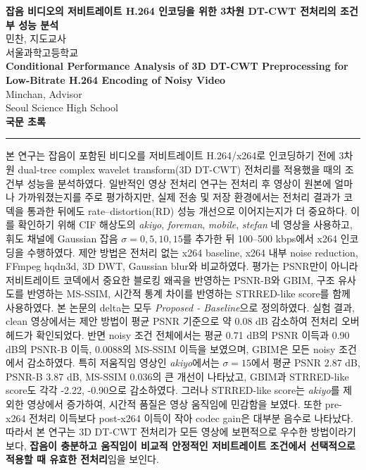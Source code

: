 \documentclass[10pt]{article}
\begin{document}
\begin{center}
{\LARGE \bf 잡음 비디오의 저비트레이트 H.264 인코딩을 위한 3차원 DT-CWT 전처리의 조건부 성능 분석}\\[12pt]
민찬, 지도교사\\
서울과학고등학교\\[12pt]
{\LARGE \bf Conditional Performance Analysis of 3D DT-CWT Preprocessing for Low-Bitrate H.264 Encoding of Noisy Video}\\[12pt]
Minchan, Advisor\\
Seoul Science High School\\[12pt]

{\large \bf 국문 초록}
\noindent\rule{\textwidth}{0.4pt}
\begin{flushleft}
본 연구는 잡음이 포함된 비디오를 저비트레이트 H.264/x264로 인코딩하기 전에 3차원 dual-tree complex wavelet transform(3D DT-CWT) 전처리를 적용했을 때의 조건부 성능을 분석하였다. 일반적인 영상 전처리 연구는 전처리 후 영상이 원본에 얼마나 가까워졌는지를 주로 평가하지만, 실제 전송 및 저장 환경에서는 전처리 결과가 코덱을 통과한 뒤에도 rate--distortion(RD) 성능 개선으로 이어지는지가 더 중요하다. 이를 확인하기 위해 CIF 해상도의 \textit{akiyo}, \textit{foreman}, \textit{mobile}, \textit{stefan} 네 영상을 사용하고, 휘도 채널에 Gaussian 잡음 $\sigma=0,5,10,15$를 추가한 뒤 100--500 kbps에서 x264 인코딩을 수행하였다. 제안 방법은 전처리 없는 x264 baseline, x264 내부 noise reduction, FFmpeg hqdn3d, 3D DWT, Gaussian blur와 비교하였다. 평가는 PSNR만이 아니라 저비트레이트 코덱에서 중요한 블로킹 왜곡을 반영하는 PSNR-B와 GBIM, 구조 유사도를 반영하는 MS-SSIM, 시간적 통계 차이를 반영하는 STRRED-like score를 함께 사용하였다. 본 논문의 delta는 모두 \textit{Proposed - Baseline}으로 정의하였다. 실험 결과, clean 영상에서는 제안 방법이 평균 PSNR 기준으로 약 0.08 dB 감소하여 전처리 오버헤드가 확인되었다. 반면 noisy 조건 전체에서는 평균 0.71 dB의 PSNR 이득과 0.90 dB의 PSNR-B 이득, 0.0088의 MS-SSIM 이득을 보였으며, GBIM은 모든 noisy 조건에서 감소하였다. 특히 저움직임 영상인 \textit{akiyo}에서는 $\sigma=15$에서 평균 PSNR 2.87 dB, PSNR-B 3.87 dB, MS-SSIM 0.036의 큰 개선이 나타났고, GBIM과 STRRED-like score도 각각 -2.22, -0.90으로 감소하였다. 그러나 STRRED-like score는 \textit{akiyo}를 제외한 영상에서 증가하여, 시간적 품질은 영상 움직임에 민감함을 보였다. 또한 pre-x264 전처리 이득보다 post-x264 이득이 작아 codec gain은 대부분 음수로 나타났다. 따라서 본 연구는 3D DT-CWT 전처리가 모든 영상에 보편적으로 우수한 방법이라기보다, \textbf{잡음이 충분하고 움직임이 비교적 안정적인 저비트레이트 조건에서 선택적으로 적용할 때 유효한 전처리}임을 보인다.


\end{flushleft}
\end{center}
\end{document}
